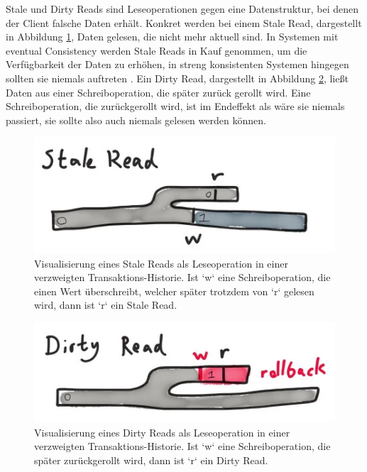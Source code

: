 \documentclass[12pt,a4paper]{report}
\begin{document}
Stale und Dirty Reads sind Leseoperationen gegen eine Datenstruktur, bei denen der Client falsche Daten erhält. Konkret werden bei
einem Stale Read, dargestellt in Abbildung \ref{fig:stale_read}, Daten gelesen, die nicht mehr aktuell sind. In Systemen mit
eventual Consistency werden Stale Reads in Kauf genommen, um die Verfügbarkeit der Daten zu erhöhen, in streng konsistenten
Systemen hingegen sollten sie niemals auftreten \cite{analysis_of_network_partition_failures}. Ein Dirty Read, dargestellt in
Abbildung \ref{fig:dirty_read}, ließt Daten aus einer Schreiboperation, die später zurück gerollt wird. Eine Schreiboperation, die
zurückgerollt wird, ist im Endeffekt als wäre sie niemals passiert, sie sollte also auch niemals gelesen werden können.
\cite{jepsen_mongo_analysis}

\begin{figure}[H]
	\centering
	\includegraphics[width=0.7\linewidth]{img/stale_read.png}
    \caption[Visualisierung eines Stale Reads]{Visualisierung eines Stale Reads als Leseoperation in einer verzweigten Transaktions-Historie.
		Ist `w` eine Schreiboperation, die einen Wert überschreibt, welcher später trotzdem von `r`
		gelesen wird, dann ist `r` ein Stale Read. \cite{jepsen_mongo_analysis}}
	\label{fig:stale_read}
\end{figure}

\begin{figure}[H]
	\centering
	\includegraphics[width=0.7\linewidth]{img/dirty_read.png}
    \caption[Visualisierung eines Dirty Reads]{Visualisierung eines Dirty Reads als Leseoperation in einer verzweigten Transaktions-Historie.
		Ist `w` eine Schreiboperation, die später zurückgerollt wird, dann ist `r` ein Dirty Read. \cite{jepsen_mongo_analysis}}
	\label{fig:dirty_read}
\end{figure}
\end{document}
